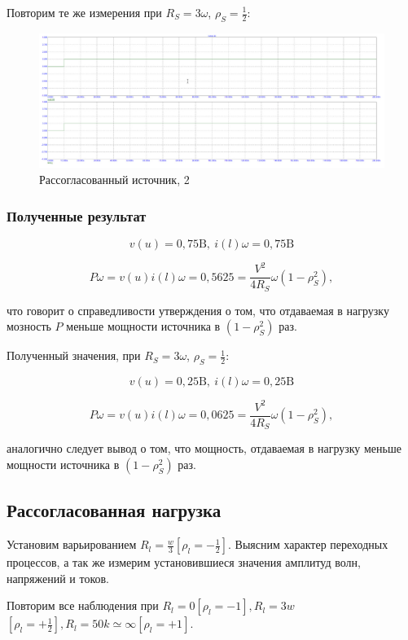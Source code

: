 \documentclass[a4paper, 14pt]{extarticle}%
\begin{document}
Повторим те же измерения при $R_{S}=3 \omega$, $\rho_{S}=\frac{1}{2}$:


\begin{figure}[h!]
			\centering
			\includegraphics[width=1.1\linewidth]{./graphs/3.jpg}
			\caption{Рассогласованный источник, 2}
			\label{2.2}
\end{figure}

\subsubsection{Полученные результат}

\[v(u)=0,75 \text{B},\ i(l) \omega=0,75\text{B}\]

\[ P \omega=v(u) i(l) \omega=0,5625=\frac{V^{2}}{4 R_{S}} \omega\left(1-\rho_{S}^{2}\right),
\]

что говорит о справедливости утверждения о том, что отдаваемая в нагрузку мозность $P$ меньше мощности источника в $(1 - \rho_{S}^2) \text{ раз}.$

Полученный значения, при $R_{S}=3 \omega$, $\rho_{S}=\frac{1}{2}$:

\[v(u)=0,25 \text{B},\ i(l) \omega=0,25\text{B}\]

\[ P \omega=v(u) i(l) \omega=0,0625=\frac{V^{2}}{4 R_{S}} \omega\left(1-\rho_{S}^{2}\right),
\]

аналогично следует вывод о том, что мощность, отдаваемая в нагрузку меньше мощности источника в $(1 - \rho_{S}^2) \text{ раз}.$

\subsection{Рассогласованная нагрузка}

Установим варьированием $R_{l}=\frac{w}{3}\left[\rho_{l}=-\frac{1}{2}\right]$. Выясним характер переходных процессов, а так же измерим установившиеся значения амплитуд волн, напряжений и токов.

Повторим все наблюдения при $R_{l}=0\left[\rho_{l}=-1\right], R_{l}=3 w$ $\left[\rho_{l}=+\frac{1}{2}\right], R_{l}=50 k \simeq \infty\left[\rho_{l}=+1\right]$.
\end{document}
